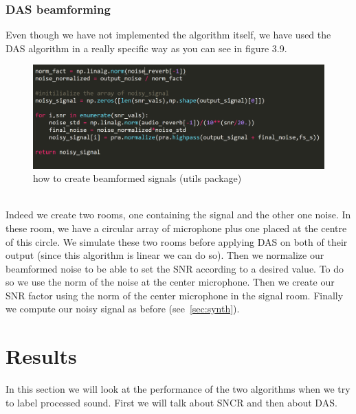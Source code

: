 \documentclass[11pt,a4paper,titlepage]{report}
\begin{document}
\subsection{DAS beamforming}
Even though we have not implemented the algorithm itself, we have used the DAS algorithm in a really specific way as you can see in figure 3.9.
\begin{figure}[h!]
	\centering
	\includegraphics[width=0.7\linewidth]{rapport14}
	\caption{how to create beamformed signals (utils package)}
	\label{fig:rapport13}
\end{figure}\\


Indeed we create two rooms, one containing the signal and the other one noise. In these room, we have a circular array of microphone plus one placed at the centre of this circle. We simulate these two rooms before applying DAS on both of their output (since this algorithm is linear we can do so). Then we normalize our beamformed noise to be able to set the SNR according to a desired value. To do so we use the norm of the noise at the center microphone. Then we create our SNR factor using the norm of the center microphone in the signal room. Finally we compute our noisy signal as before (see~\ref{sec:synth}).


\chapter{Results}
\hspace*{0.6cm}
In this section we will look at the performance of the two algorithms when we try to label processed sound. First we will talk about SNCR and then about DAS.
\end{document}
